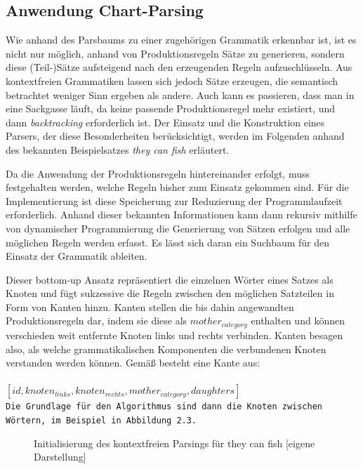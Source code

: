\documentclass[12pt]{report}
\begin{document}
\subsection{Anwendung Chart-Parsing}
Wie anhand des Parsbaums zu einer zugehörigen Grammatik erkennbar ist, ist es nicht nur möglich, anhand von Produktionsregeln Sätze zu generieren, sondern diese (Teil-)Sätze aufsteigend nach den erzeugenden Regeln aufzuschlüsseln. Aus kontextfreien Grammatiken lassen sich jedoch Sätze erzeugen, die semantisch betrachtet weniger Sinn ergeben als andere. Auch kann es passieren, dass man in eine Sackgasse läuft, da keine passende Produktionsregel mehr existiert, und dann \textit{backtracking} erforderlich ist. Der Einsatz und die Konstruktion eines Parsers, der diese Besonderheiten berücksichtigt, werden im Folgenden anhand des bekannten Beispielsatzes \textit{they can fish} erläutert.

Da die Anwendung der Produktionsregeln hintereinander erfolgt, muss festgehalten werden, welche Regeln bisher zum Einsatz gekommen sind. Für die Implementierung ist diese Speicherung zur Reduzierung der Programmlaufzeit erforderlich. Anhand dieser bekannten Informationen kann dann rekursiv mithilfe von dynamischer Programmierung die Generierung von Sätzen erfolgen und alle möglichen Regeln werden erfasst. Es lässt sich daran ein Suchbaum für den Einsatz der Grammatik ableiten. 

Dieser bottom-up Ansatz repräsentiert die einzelnen Wörter eines Satzes als Knoten und fügt sukzessive die Regeln zwischen den möglichen Satzteilen in Form von Kanten hinzu. Kanten stellen die bis dahin angewandten Produktionsregeln dar, indem sie diese als \textit{$mother_{category}$} enthalten und können verschieden weit entfernte Knoten links und rechts verbinden. Kanten besagen also, als welche grammatikalischen Komponenten die verbundenen Knoten verstanden werden können. Gemäß \cite{cop04} besteht eine Kante aus:
\\
\tt
\\$[id, knoten_{links}, knoten_{rechts}, mother_{category}, daughters]$
\rm
\\

Die Grundlage für den Algorithmus sind dann die Knoten zwischen Wörtern, im Beispiel in Abbildung 2.3.\\

\begin{figure}[h!]
\begin{center}
\caption{Initialisierung des kontextfreien Parsings für \glqq  they can fish\grqq{} [eigene Darstellung]}
\end{center}
\end{figure}
\end{document}
